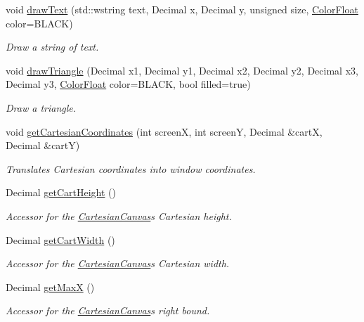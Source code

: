 \begin{DoxyCompactItemize}
void \hyperlink{classtsgl_1_1_cartesian_canvas_addacb4d3637bf2674e2a992a0c165160}{draw\+Text} (std\+::wstring text, Decimal x, Decimal y, unsigned size, \hyperlink{structtsgl_1_1_color_float}{Color\+Float} color=B\+L\+A\+C\+K)
\begin{DoxyCompactList}\small\item\em Draw a string of text. \end{DoxyCompactList}\item 
void \hyperlink{classtsgl_1_1_cartesian_canvas_a67c225592f9416de476943bb93309cd1}{draw\+Triangle} (Decimal x1, Decimal y1, Decimal x2, Decimal y2, Decimal x3, Decimal y3, \hyperlink{structtsgl_1_1_color_float}{Color\+Float} color=B\+L\+A\+C\+K, bool filled=true)
\begin{DoxyCompactList}\small\item\em Draw a triangle. \end{DoxyCompactList}\item 
void \hyperlink{classtsgl_1_1_cartesian_canvas_a736935074bb6d90bcc0c7af2edd8a4aa}{get\+Cartesian\+Coordinates} (int screen\+X, int screen\+Y, Decimal \&cart\+X, Decimal \&cart\+Y)
\begin{DoxyCompactList}\small\item\em Translates Cartesian coordinates into window coordinates. \end{DoxyCompactList}\item 
Decimal \hyperlink{classtsgl_1_1_cartesian_canvas_a66657636eaf20ff465898d3f932063ce}{get\+Cart\+Height} ()
\begin{DoxyCompactList}\small\item\em Accessor for the \hyperlink{classtsgl_1_1_cartesian_canvas}{Cartesian\+Canvas}\textquotesingle{}s Cartesian height. \end{DoxyCompactList}\item 
Decimal \hyperlink{classtsgl_1_1_cartesian_canvas_a829a97323261515097b7589bc96c109c}{get\+Cart\+Width} ()
\begin{DoxyCompactList}\small\item\em Accessor for the \hyperlink{classtsgl_1_1_cartesian_canvas}{Cartesian\+Canvas}\textquotesingle{}s Cartesian width. \end{DoxyCompactList}\item 
Decimal \hyperlink{classtsgl_1_1_cartesian_canvas_ae3cbac386f78ecff082b8c4cbd9081ed}{get\+Max\+X} ()
\begin{DoxyCompactList}\small\item\em Accessor for the \hyperlink{classtsgl_1_1_cartesian_canvas}{Cartesian\+Canvas}\textquotesingle{}s right bound. \end{DoxyCompactList}\item 

\end{DoxyCompactItemize}
